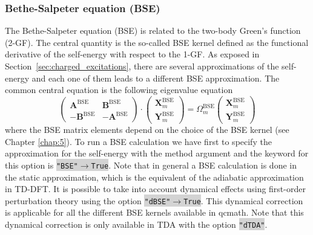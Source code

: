 \documentclass[aip,jcp,reprint,noshowkeys,superscriptaddress]{revtex4-1}
\newcommand{\BSE}{\text{BSE}}
\newcommand{\bX}{\bm{X}}
\newcommand{\bY}{\bm{Y}}
\newcommand{\bA}{\mathbf{A}}
\newcommand{\bB}{\mathbf{B}}
\newcommand{\Ome}{\Omega}
\newcommand{\keyword}[1]{{\colorbox{lightgray}{\texttt{#1}}}}
\begin{document}
\subsubsection*{Bethe-Salpeter equation (BSE)}
The Bethe-Salpeter equation (BSE) is related to the two-body Green's function (2-GF). The central quantity is the so-called BSE kernel defined as the functional derivative of the self-energy with respect to the 1-GF. As exposed in Section~\ref{sec:charged_excitations}, there are several approximations of the self-energy and each one of them leads to a different BSE approximation. The common central equation is the following eigenvalue equation
\begin{equation}
    \begin{pmatrix}
    	\bA^{\BSE} & \bB^{\BSE} 
		\\
	    -\bB^{\BSE} & -\bA^{\BSE}
    \end{pmatrix}
	\cdot 
    \begin{pmatrix}
	    \bX_{m}^{\BSE} 
	    \\
	    \bY_{m}^{\BSE}
    \end{pmatrix}
	=
	\Ome_{m}^{\BSE}
	\begin{pmatrix}
		\bX_{m}^{\BSE} 
		\\
		\bY_{m}^{\BSE}
	\end{pmatrix}
\end{equation}
where the BSE matrix elements depend on the choice of the BSE kernel (see Chapter \ref{chap:5}). To run a BSE calculation we have first to specify the approximation for the self-energy with the method argument and the keyword for this option is \keyword{"BSE"$\rightarrow$True}. Note that in general a BSE calculation is done in the static approximation, which is the equivalent of the adiabatic approximation in TD-DFT. It is possible to take into account dynamical effects using first-order perturbation theory \cite{Loos_2020h} using the option \keyword{"dBSE"$\rightarrow$True}. This dynamical correction is applicable for all the different BSE kernels available in qcmath. Note that this dynamical correction is only available in TDA with the option \keyword{"dTDA"}.
\end{document}
